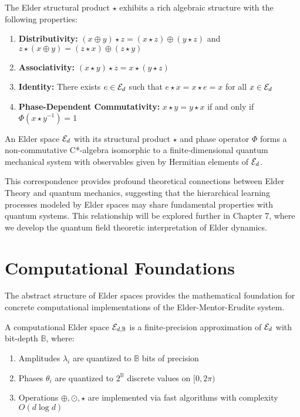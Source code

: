 \begin{proposition}
The Elder structural product $\star$ exhibits a rich algebraic structure with the following properties:
\begin{enumerate}
    \item \textbf{Distributivity:} $(x \oplus y) \star z = (x \star z) \oplus (y \star z)$ and $z \star (x \oplus y) = (z \star x) \oplus (z \star y)$
    \item \textbf{Associativity:} $(x \star y) \star z = x \star (y \star z)$
    \item \textbf{Identity:} There exists $e \in \mathcal{E}_{d}$ such that $e \star x = x \star e = x$ for all $x \in \mathcal{E}_{d}$
    \item \textbf{Phase-Dependent Commutativity:} $x \star y = y \star x$ if and only if $\Phi(x \star y^{-1}) = 1$
\end{enumerate}
\end{proposition}

\begin{theorem}
\label{thm:elder-quantum}
An Elder space $\mathcal{E}_{d}$ with its structural product $\star$ and phase operator $\Phi$ forms a non-commutative C*-algebra isomorphic to a finite-dimensional quantum mechanical system with observables given by Hermitian elements of $\mathcal{E}_{d}$.
\end{theorem}

This correspondence provides profound theoretical connections between Elder Theory and quantum mechanics, suggesting that the hierarchical learning processes modeled by Elder spaces may share fundamental properties with quantum systems. This relationship will be explored further in Chapter 7, where we develop the quantum field theoretic interpretation of Elder dynamics.

\section{Computational Foundations}

The abstract structure of Elder spaces provides the mathematical foundation for concrete computational implementations of the Elder-Mentor-Erudite system.

\begin{definition}
A computational Elder space $\mathcal{E}_{d, \mathbb{B}}$ is a finite-precision approximation of $\mathcal{E}_{d}$ with bit-depth $\mathbb{B}$, where:
\begin{enumerate}
    \item Amplitudes $\lambda_i$ are quantized to $\mathbb{B}$ bits of precision
    \item Phases $\theta_i$ are quantized to $2^{\mathbb{B}}$ discrete values on $[0, 2\pi)$
    \item Operations $\oplus, \odot, \star$ are implemented via fast algorithms with complexity $O(d \log d)$
\end{enumerate}
\end{definition}

